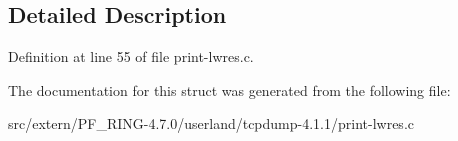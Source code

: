 \subsection{Detailed Description}


Definition at line 55 of file print-\/lwres.c.



The documentation for this struct was generated from the following file:\begin{DoxyCompactItemize}
\item 
src/extern/PF\_\-RING-\/4.7.0/userland/tcpdump-\/4.1.1/print-\/lwres.c\end{DoxyCompactItemize}
